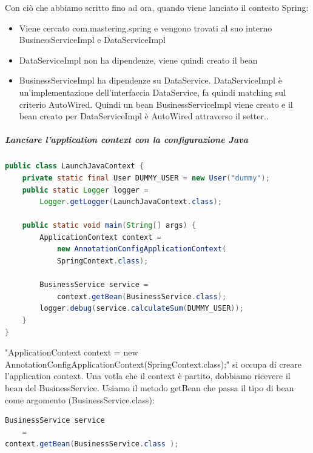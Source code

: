 \documentclass[11pt,a4paper]{book}
\begin{document}
Con ciò che abbiamo scritto fino ad ora, quando viene lanciato il contesto Spring:
\begin{itemize}
	\item Viene cercato com.mastering.spring e vengono trovati al suo interno BusinessServiceImpl e DataServiceImpl
	\item DataServiceImpl non ha dipendenze, viene quindi creato il bean
	\item BusinessServiceImpl ha dipendenze su DataService. DataServiceImpl è un'implementazione dell'interfaccia DataService, fa quindi matching sul criterio AutoWired. Quindi un bean BusinessServiceImpl viene creato e il bean creato per DataServiceImpl è AutoWired attraverso il setter..
\end{itemize}
\subparagraph{Lanciare l'application context con la configurazione Java}
\begin{lstlisting}[language = Java]
public class LaunchJavaContext {
	private static final User DUMMY_USER = new User("dummy");
	public static Logger logger =
		Logger.getLogger(LaunchJavaContext.class);
	
	public static void main(String[] args) {
		ApplicationContext context = 
			new AnnotationConfigApplicationContext(
			SpringContext.class);
			
		BusinessService service =
			context.getBean(BusinessService.class);
		logger.debug(service.calculateSum(DUMMY_USER));
	}
}
\end{lstlisting}
"ApplicationContext context =  new AnnotationConfigApplicationContext(SpringContext.class);" si occupa di creare l'application context. Una votla che il context è partito, dobbiamo ricevere il bean del BusinessService. Usiamo il metodo getBean che passa il tipo di bean come argomento (BusinessService.class):
\begin{lstlisting}[language = Java]
BusinessService service
	= 
context.getBean(BusinessService.class );
\end{lstlisting}
\end{document}

